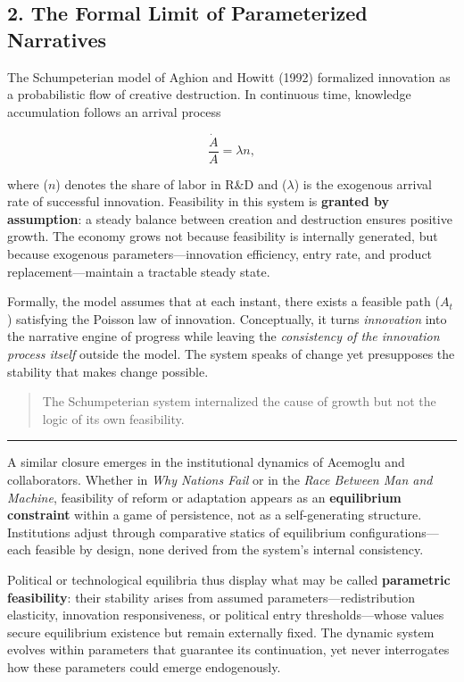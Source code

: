 \documentclass[11pt]{article}
\begin{document}
\subsection{2. The Formal Limit of Parameterized
Narratives}\label{the-formal-limit-of-parameterized-narratives}

The Schumpeterian model of Aghion and Howitt (1992) formalized
innovation as a probabilistic flow of creative destruction. In
continuous time, knowledge accumulation follows an arrival process

\[
\frac{\dot{A}}{A} = \lambda n,
\]

where (\(n\)) denotes the share of labor in R\&D and (\(\lambda\)) is
the exogenous arrival rate of successful innovation. Feasibility in this
system is \textbf{granted by assumption}: a steady balance between
creation and destruction ensures positive growth. The economy grows not
because feasibility is internally generated, but because exogenous
parameters---innovation efficiency, entry rate, and product
replacement---maintain a tractable steady state.

Formally, the model assumes that at each instant, there exists a
feasible path (\(A_t\)) satisfying the Poisson law of innovation.
Conceptually, it turns \emph{innovation} into the narrative engine of
progress while leaving the \emph{consistency of the innovation process
itself} outside the model. The system speaks of change yet presupposes
the stability that makes change possible.

\begin{quote}
The Schumpeterian system internalized the cause of growth but not the
logic of its own feasibility.
\end{quote}

\begin{center}\rule{0.5\linewidth}{0.5pt}\end{center}

A similar closure emerges in the institutional dynamics of Acemoglu and
collaborators. Whether in \emph{Why Nations Fail} or in the \emph{Race
Between Man and Machine}, feasibility of reform or adaptation appears as
an \textbf{equilibrium constraint} within a game of persistence, not as
a self-generating structure. Institutions adjust through comparative
statics of equilibrium configurations---each feasible by design, none
derived from the system's internal consistency.

Political or technological equilibria thus display what may be called
\textbf{parametric feasibility}: their stability arises from assumed
parameters---redistribution elasticity, innovation responsiveness, or
political entry thresholds---whose values secure equilibrium existence
but remain externally fixed. The dynamic system evolves within
parameters that guarantee its continuation, yet never interrogates how
these parameters could emerge endogenously.
\end{document}
